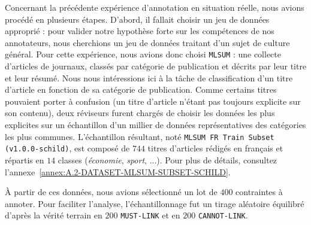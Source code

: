 			Concernant la précédente expérience d'annotation en situation réelle, nous avions procédé en plusieurs étapes.
			D'abord, il fallait choisir un jeu de données approprié : pour valider notre hypothèse forte sur les compétences de nos annotateurs, nous cherchions un jeu de données traitant d'un sujet de culture général.
			Pour cette expérience, nous avions donc choisi \texttt{MLSUM} : une collecte d'articles de journaux, classés par catégorie de publication et décrits par leur titre et leur résumé.
			Nous nous intéressions ici à la tâche de classification d'un titre d'article en fonction de sa catégorie de publication.
			Comme certains titres pouvaient porter à confusion (un titre d'article n'étant pas toujours explicite sur son contenu), deux réviseurs furent chargés de choisir les données les plus explicites sur un échantillon d'un millier de données représentatives des catégories les plus communes.
			L'échantillon résultant, noté \texttt{MLSUM FR Train Subset (v1.0.0-schild)}, est composé de $744$ titres d'articles rédigés en français et répartis en $14$ classes (\textit{économie}, \textit{sport}, ...).
			Pour plus de détails, consultez l'annexe~\ref{annex:A.2-DATASET-MLSUM-SUBSET-SCHILD}.
		
			À partir de ces données, nous avions sélectionné un lot de $400$ contraintes à annoter.
			Pour faciliter l'analyse, l'échantillonnage fut un tirage aléatoire équilibré d'après la vérité terrain en $200$ \texttt{MUST-LINK} et en $200$ \texttt{CANNOT-LINK}.
			
